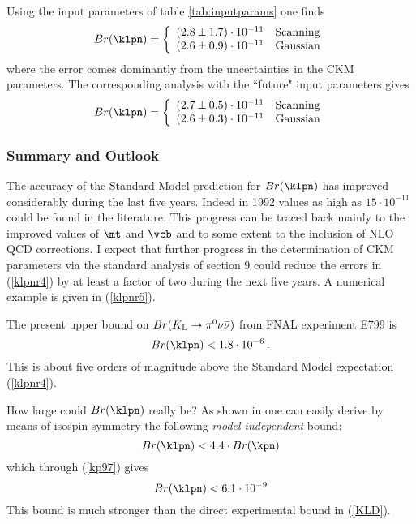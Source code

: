 Using the input parameters of table \ref{tab:inputparams}
one finds \cite{BJL96b}
\begin{equation}\label{klpnr4}
Br(\klpn)=\left\{ \begin{array}{ll}
(2.8 \pm 1.7)\cdot 10^{-11} & {\rm Scanning} \\
(2.6 \pm 0.9) \cdot 10^{-11} & {\rm Gaussian} \end{array} \right.
\end{equation}
where the error comes dominantly from the uncertainties in the CKM
parameters. The corresponding analysis with the ``future" input
parameters gives
\begin{equation}\label{klpnr5}
Br(\klpn)=\left\{ \begin{array}{ll}
(2.7 \pm 0.5)\cdot 10^{-11} & {\rm Scanning} \\
(2.6 \pm 0.3) \cdot 10^{-11} & {\rm Gaussian} \end{array} \right.
\end{equation}
\subsubsection{Summary and Outlook}
The accuracy of the Standard Model prediction for $Br(\klpn)$ has
improved considerably during the last five years. Indeed in 1992
values as high as $15\cdot 10^{-11}$ could be found in the
literature. This progress can be traced back mainly to the
improved values of $\mt$ and $\vcb$ and to some extent to 
the inclusion of NLO QCD corrections.
I expect that further progress
in the determination of CKM parameters via the standard analysis of
section 9 could reduce the errors in (\ref{klpnr4}) by at least a
factor of two during the next five years.
A numerical example is given in (\ref{klpnr5}).

The present upper bound on $Br(K_{\rm L}\to \pi^0\nu\bar\nu)$ from
FNAL experiment E799 \cite{XX97} is 
\begin{equation}\label{KLD}
Br(\klpn)<1.8 \cdot 10^{-6}\,.
\end{equation}
This is about five orders of magnitude above the Standard Model expectation
(\ref{klpnr4}).

How large could $Br(\klpn)$ really be? As shown  in \cite{NIR96}
one can easily derive by means of isospin symmetry the following 
{\it model independent} bound:
\begin{equation}
Br(\klpn) < 4.4 \cdot Br(\kpn)
\end{equation}
which through (\ref{kp97})  gives
\begin{equation}\label{B108}
Br(\klpn) < 6.1 \cdot 10^{-9}
\end{equation}
This bound is much stronger than the direct experimental bound in
(\ref{KLD}).

